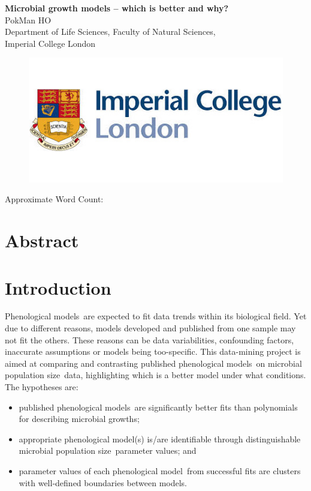 \documentclass[a4paper, 11pt]{article}
\title{\ReportTitle}
\author{\ReportAuthor\ (CID: 01786076)}
\date{}
\newcommand{\pml}{phenological model}
\newcommand{\pms}{phenological models}
\newcommand{\Pms}{Phenological models}
\newcommand{\ReportTitle}{Microbial growth models -- which is better and why?} %
\newcommand{\ReportAuthor}{PokMan HO}
\newcommand{\ReportAffil}{Department of Life Sciences, Faculty of Natural Sciences,\\Imperial College London}
\newcommand{\pop}{population size}
\begin{document}
	\begin{center}
		\Huge\textbf{\ReportTitle}\\
		\LARGE\ReportAuthor\\
		\Large\ReportAffil
	\end{center}
	\begin{figure}[h]
		\centering\includegraphics[width=\linewidth]{icl.jpg}
	\end{figure}
	\begin{flushright}
		\Large Approximate Word Count: %
	\end{flushright}
	\clearpage
	
	\maketitle
	\section*{Abstract}
	
	
	\section*{Introduction}
	\Pms\ are expected to fit data trends within its biological field.  Yet due to different reasons, models developed and published from one sample may not fit the others.  These reasons can be data variabilities, confounding factors, inaccurate assumptions or models being too-specific.  This data-mining project is aimed at comparing and contrasting published \pms\ on microbial \pop\ data, highlighting which is a better model under what conditions.  The hypotheses are:
	\begin{itemize}
		\item published \pms\ are significantly better fits than polynomials for describing microbial growths;
		\item appropriate \pml(s) is/are identifiable through distinguishable microbial \pop\ parameter values; and
		\item parameter values of each \pml\ from successful fits are clusters with well-defined boundaries between models.
	\end{itemize}
	
\end{document}
